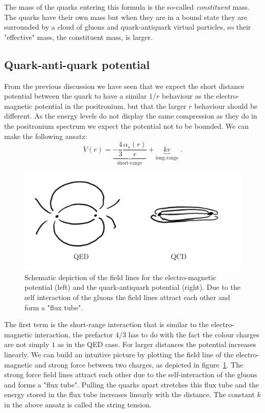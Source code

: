 \documentclass[12pt]{article}
\begin{document}
The mass of the quarks entering this formula is the so-called \emph{constituent} mass. The quarks have their own mass but when they are in a bound state they are surrounded by a cloud of gluons and quark-antiquark virtual particles, so their "effective" mass, the constituent mass, is larger.  
\subsection{Quark-anti-quark potential}
From the previous discussion we have seen that we expect the short distance potential between the quark to have a similar $1/r$ behaviour as the electro-magnetic potential in the positronium, but that the larger $r$ behaviour should be different. As the energy levels do not display the same compression as they do in the positronium spectrum we expect the potential not to be bounded. We can make the following ansatz:
\[V(r) = \underbrace{-\frac{4}{3}\frac{\alpha_s(r)}{r}}_{\mbox{short-range}}
+\underbrace{kr}_{\mbox{long-range}}\;.
\]  
\begin{figure}
\begin{center}
\includegraphics[scale=0.2]{images/QEDQCD_withlabel.png}
\end{center}
\caption{Schematic depiction of the field lines for the electro-magnetic potential (left) and the quark-antiquark potential (right). Due to the self interaction of the gluons the field lines attract each other and form a "flux tube".}\label{fig:fieldLines}
\end{figure}
The first term is the short-range interaction that is similar to the electro-magnetic interaction, the prefactor $4/3$ has to do with the fact the colour charges are not simply $1$ as in the QED case. For larger distances the potential increases linearly. We can build an intuitive picture by plotting the field line of the electro-magnetic and strong force between two charges, as depicted in figure~\ref{fig:fieldLines}. The strong force field lines attract each other due to the self-interaction of the gluons and forms a "flux tube". Pulling the quarks apart stretches this flux tube and the energy stored in the flux tube increases linearly with the distance. The constant $k$ in the above ansatz is called the string tension. 
\end{document}
